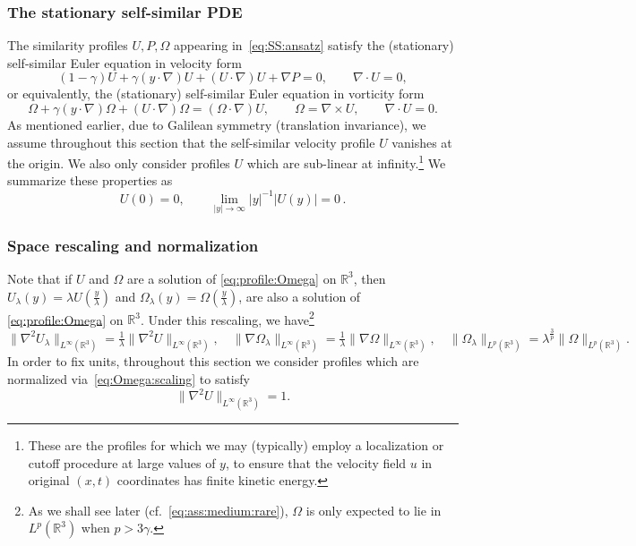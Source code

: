 \documentclass[11pt,reqno]{amsproc}
\numberwithin{equation}{section}
\theoremstyle{remark}
\begin{document}
\subsubsection{The stationary self-similar PDE}
The similarity profiles $U,P,\Omega$ appearing in~\eqref{eq:SS:ansatz} satisfy the (stationary) self-similar Euler equation in velocity form
\begin{equation}
(1-\gamma) U + \gamma (y \cdot \nabla) U + (U \cdot \nabla) U + \nabla P = 0,
\qquad 
\nabla \cdot U = 0 ,
\label{eq:profile:U}
\end{equation}
or equivalently, the (stationary) self-similar Euler equation in vorticity form
\begin{equation}
\Omega + \gamma (y \cdot \nabla) \Omega + (U \cdot \nabla) \Omega = (\Omega \cdot \nabla) U
,
\qquad 
\Omega = \nabla \times U
,
\qquad 
\nabla \cdot U = 0 .
\label{eq:profile:Omega}
\end{equation}
As mentioned earlier, due to Galilean symmetry (translation invariance), we assume throughout this section that the self-similar velocity profile $U$ vanishes at the origin. We also only consider profiles $U$ which are sub-linear at infinity.\footnote{
These are the profiles for which we may (typically) employ a localization or cutoff  procedure at
large values of $y$, to ensure that the velocity field $u$ in original $(x,t)$ coordinates has finite kinetic energy.}
We summarize these properties as
\begin{equation}
U(0) = 0,
\qquad
\lim_{|y|\to \infty} |y|^{-1} |U(y)| = 0 \,.
\label{eq:U:non:negotiable} 
\end{equation}

\subsubsection{Space rescaling and normalization}
Note that if $U$ and $\Omega$ are a solution of \eqref{eq:profile:Omega} on $\mathbb{R}^3$, then   
$U_{\lambda}(y)= \lambda U(\tfrac{y}{\lambda})$ and $\Omega_{\lambda}(y) =  \Omega(\tfrac{y}{\lambda})$, 
are also a solution of \eqref{eq:profile:Omega} on $\mathbb{R}^3$.
Under this rescaling, we have\footnote{As we shall see later (cf.~\eqref{eq:ass:medium:rare}), $\Omega$ is only expected to lie in $L^p(\mathbb{R}^3)$ when $p > 3 \gamma$.} 
\begin{equation}
\|\nabla^2 U_\lambda\|_{L^\infty(\mathbb{R}^3)}
= \tfrac{1}{\lambda} \|\nabla^2 U\|_{L^\infty(\mathbb{R}^3)}
,\quad
\|\nabla \Omega_\lambda\|_{L^\infty(\mathbb{R}^3)}    
= \tfrac{1}{\lambda}  \|\nabla \Omega\|_{L^\infty(\mathbb{R}^3)}    
,\quad 
\| \Omega_\lambda\|_{L^p(\mathbb{R}^3)}    
=  \lambda^{\frac{3}{p}} \|\Omega\|_{L^p(\mathbb{R}^3)}   
.
\label{eq:Omega:scaling}
\end{equation}
In order to fix units, throughout this section we consider profiles which are normalized via~\eqref{eq:Omega:scaling} to satisfy
\begin{equation}
\| \nabla^2 U \|_{L^\infty(\mathbb{R}^3)}  = 1 .
\label{eq:U:scaling} 
\end{equation}
\end{document}
